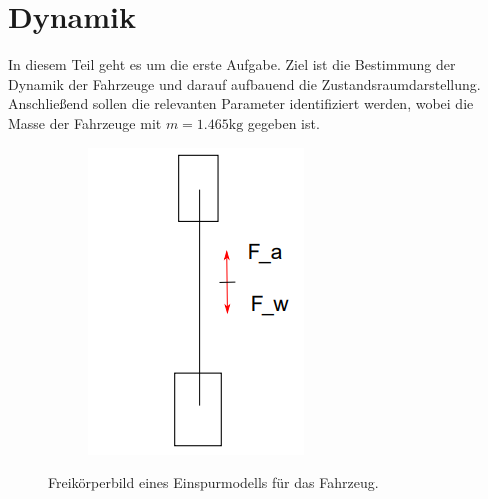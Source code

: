 \chapter{Dynamik}\label{chp:dynamik}
In diesem Teil geht es um die erste Aufgabe. Ziel ist die Bestimmung der Dynamik
der Fahrzeuge und darauf aufbauend die Zustandsraumdarstellung. Anschließend
sollen die relevanten Parameter identifiziert werden, wobei die Masse der
Fahrzeuge mit $m=1.465 \mathrm{kg}$ gegeben ist.
\begin{figure}[hbt]
\centering
\begin{subfigure}{0.15\textwidth}
    \centering
    \includegraphics*[width=\textwidth]{figures/FKB_Auto.png}
\end{subfigure}
    \caption{Freikörperbild eines Einspurmodells für das Fahrzeug.
    \label{fig:fkb_auto}}
\end{figure}    
